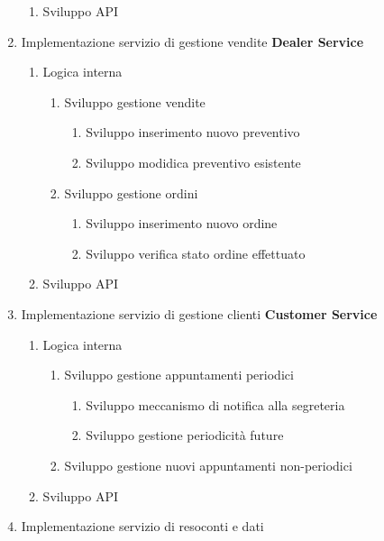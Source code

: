 \documentclass{article}
\begin{document}
\begin{enumerate}
\begin{enumerate}
        \item Sviluppo API
    \end{enumerate}
    \item Implementazione servizio di gestione vendite \textbf{Dealer Service}
    \begin{enumerate}
        \item Logica interna
        \begin{enumerate}
            \item Sviluppo gestione vendite
            \begin{enumerate}
                \item Sviluppo inserimento nuovo preventivo
                \item Sviluppo modidica preventivo esistente
            \end{enumerate}
            \item Sviluppo gestione ordini
            \begin{enumerate}
                \item Sviluppo inserimento nuovo ordine
                \item Sviluppo verifica stato ordine effettuato
            \end{enumerate}
        \end{enumerate}
        \item Sviluppo API
    \end{enumerate}
    \item Implementazione servizio di gestione clienti \textbf{Customer Service}
    \begin{enumerate}
        \item Logica interna
            \begin{enumerate}
                \item Sviluppo gestione appuntamenti periodici
                \begin{enumerate}
                    \item Sviluppo meccanismo di notifica alla segreteria
                    \item Sviluppo gestione periodicità future 
                \end{enumerate}
                \item Sviluppo gestione nuovi appuntamenti non-periodici
            \end{enumerate} 
        \item Sviluppo API
    \end{enumerate}
    \item Implementazione servizio di resoconti e dati 

\end{enumerate}
\end{document}
